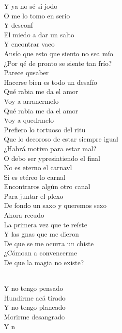 \begin{cancion}[Arrancármelo][Wos]
Y ya no sé si jodo\\
O me lo tomo en serio\\
	Y desconf\\
El miedo a dar un salto\\
	Y encontrar vaco\\
Ansío que esto que siento no sea mío\\
	¿Por qé de pronto se siente tan frío?\\
	Parece qusaber\\
Hacerse bien es todo un desafío\\
	 Qué rabia me da el amor\\
	Voy a arrancrmelo\\
Qué rabia me da el amor\\
	Voy a quedrmelo \\
	Prefiero lo tortuoso del ritu\\
Que lo decoroso de estar siempre igual\\
	 ¿Habrá motivo para estar mal?\\
	O debo ser ypresintiendo el final\\
	No es eterno el carnavl\\
Si es etéreo lo carnal\\
	Encontraros algún otro canal\\
Para juntar el plexo\\
	 De fondo un saxo y queremos sexo\\
	Ahora recudo\\
La primera vez que te reíste\\
	Y las gnas que me dieron\\
De que se me ocurra un chiste\\
	¿Cómoan a convencerme\\
De que la magia no existe?\\\jump\\
	\begin{chorus}%
	 Y no tengo pensado\\
	 Hundirme acá tirado\\
	 Y no tengo planeado\\
	 Morirme desangrado\\
	Y n\\

\end{chorus}
\end{cancion}
